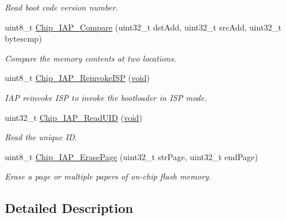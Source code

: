 \begin{DoxyCompactItemize}
\begin{DoxyCompactList}\small\item\em Read boot code version number. \end{DoxyCompactList}\item 
uint8\-\_\-t \hyperlink{group__COMMON__IAP_ga0f3983319210f99d1931f1e9fa762d9e}{Chip\-\_\-\-I\-A\-P\-\_\-\-Compare} (uint32\-\_\-t dst\-Add, uint32\-\_\-t src\-Add, uint32\-\_\-t bytescmp)
\begin{DoxyCompactList}\small\item\em Compare the memory contents at two locations. \end{DoxyCompactList}\item 
uint8\-\_\-t \hyperlink{group__COMMON__IAP_ga91a6ef5cac3a052f637cf0b5d7d31d53}{Chip\-\_\-\-I\-A\-P\-\_\-\-Reinvoke\-I\-S\-P} (\hyperlink{Paradigm_2Tern__EE_2small_2portmacro_8h_a14d32f8130d3c0b212cfc751730b5b49}{void})
\begin{DoxyCompactList}\small\item\em I\-A\-P reinvoke I\-S\-P to invoke the bootloader in I\-S\-P mode. \end{DoxyCompactList}\item 
uint32\-\_\-t \hyperlink{group__COMMON__IAP_ga2835e129423f1ce0628004a8adf00773}{Chip\-\_\-\-I\-A\-P\-\_\-\-Read\-U\-I\-D} (\hyperlink{Paradigm_2Tern__EE_2small_2portmacro_8h_a14d32f8130d3c0b212cfc751730b5b49}{void})
\begin{DoxyCompactList}\small\item\em Read the unique I\-D. \end{DoxyCompactList}\item 
uint8\-\_\-t \hyperlink{group__COMMON__IAP_ga95ca28fb39884184657054e134671f95}{Chip\-\_\-\-I\-A\-P\-\_\-\-Erase\-Page} (uint32\-\_\-t str\-Page, uint32\-\_\-t end\-Page)
\begin{DoxyCompactList}\small\item\em Erase a page or multiple papers of on-\/chip flash memory. \end{DoxyCompactList}\end{DoxyCompactItemize}


\subsection{Detailed Description}


